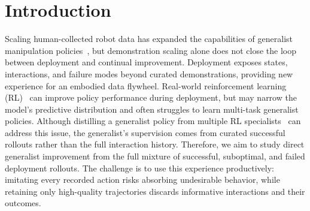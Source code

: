 \section{Introduction}
\label{sec:introduction}

Scaling human-collected robot data has expanded the capabilities of generalist manipulation policies~\citep{o2024open}, but demonstration scaling alone does not close the loop between deployment and continual improvement.
Deployment exposes states, interactions, and failure modes beyond curated demonstrations, providing new experience for an embodied data flywheel.
Real-world reinforcement learning (RL)~\citep{xu2026rlt} can improve policy performance during deployment, but may narrow the model's predictive distribution and often struggles to learn multi-task generalist policies.
Although distilling a generalist policy from multiple RL specialists~\citep{xiao2025pld} can address this issue, the generalist's supervision comes from curated successful rollouts rather than the full interaction history.
Therefore, we aim to study direct generalist improvement from the full mixture of successful, suboptimal, and failed deployment rollouts.
The challenge is to use this experience productively: imitating every recorded action risks absorbing undesirable behavior, while retaining only high-quality trajectories discards informative interactions and their outcomes.

